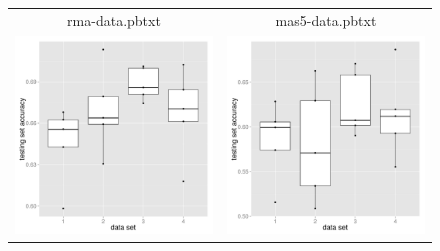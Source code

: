 \begin{figure}
\begin{centering}
\begin{tabular}{cc}
rma-data.pbtxt & mas5-data.pbtxt\tabularnewline
\includegraphics[width=0.34\paperwidth]{images/breast_cancer_08-accuracies-testing-bb_bu.pdf} & \includegraphics[width=0.34\paperwidth]{images/breast_cancer_08-accuracies-testing-by_cr.pdf}\tabularnewline

\end{tabular}
\end{centering}
\end{figure}
